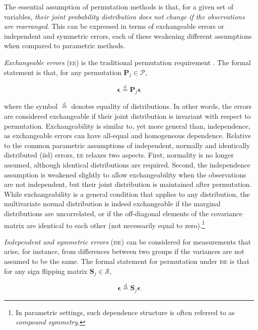 The essential assumption of permutation methods is that, for a given set of variables, \emph{their joint probability distribution does not change if the observations are rearranged}. This can be expressed in terms of exchangeable errors or independent and symmetric errors, each of these weakening different assumptions when compared to parametric methods.

\emph{Exchangeable errors} (\textsc{ee}) is the traditional permutation requirement \citep{Good2005}. The formal statement is that, for any permutation $\mathbf{P}_{j} \in \mathcal{P}$,

\begin{equation}
\boldsymbol{\epsilon} \stackrel{\mathrm{d}}{=} \mathbf{P}_{j}\boldsymbol{\epsilon}
\end{equation}

\noindent where the symbol $\stackrel{\mathrm{d}}{=}$ denotes equality of distributions. In other words, the errors are considered exchangeable if their joint distribution is invariant with respect to permutation. Exchangeability is similar to, yet more general than, independence, as exchangeable errors can have all-equal and homogeneous dependence. Relative to the common parametric assumptions of independent, normally and identically distributed (iid) errors, \textsc{ee} relaxes two aspects. First, normality is no longer assumed, although identical distributions are required. Second, the independence assumption is weakened slightly to allow exchangeability when the observations are not independent, but their joint distribution is maintained after permutation. While exchangeability is a general condition that applies to any distribution, the multivariate normal distribution is indeed exchangeable if the marginal distributions are uncorrelated, or if the off-diagonal elements of the covariance matrix are identical to each other (not necessarily equal to zero).\footnote{In parametric settings, such dependence structure is often referred to as \emph{compound symmetry}.}

\emph{Independent and symmetric errors} (\textsc{ise}) can be considered for measurements that arise, for instance, from differences between two groups if the variances are not assumed to be the same. The formal statement for permutation under \textsc{ise} is that for any sign flipping matrix $\mathbf{S}_{j} \in \mathcal{S}$,

\begin{equation}
\boldsymbol{\epsilon} \stackrel{\mathrm{d}}{=} \mathbf{S}_{j}\boldsymbol{\epsilon}
\end{equation}

